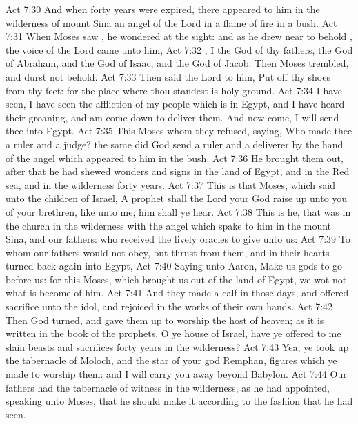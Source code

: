 \vs Act 7:30 And when forty years were expired, there appeared to him in the wilderness of mount Sina an angel of the Lord in a flame of fire in a bush.
\vs Act 7:31 When Moses saw , he wondered at the sight: and as he drew near to behold , the voice of the Lord came unto him,
\vs Act 7:32 , I  the God of thy fathers, the God of Abraham, and the God of Isaac, and the God of Jacob. Then Moses trembled, and durst not behold.
\vs Act 7:33 Then said the Lord to him, Put off thy shoes from thy feet: for the place where thou standest is holy ground.
\vs Act 7:34 I have seen, I have seen the affliction of my people which is in Egypt, and I have heard their groaning, and am come down to deliver them. And now come, I will send thee into Egypt.
\vs Act 7:35 This Moses whom they refused, saying, Who made thee a ruler and a judge? the same did God send  a ruler and a deliverer by the hand of the angel which appeared to him in the bush.
\vs Act 7:36 He brought them out, after that he had shewed wonders and signs in the land of Egypt, and in the Red sea, and in the wilderness forty years.
\vs Act 7:37 This is that Moses, which said unto the children of Israel, A prophet shall the Lord your God raise up unto you of your brethren, like unto me; him shall ye hear.
\vs Act 7:38 This is he, that was in the church in the wilderness with the angel which spake to him in the mount Sina, and  our fathers: who received the lively oracles to give unto us:
\vs Act 7:39 To whom our fathers would not obey, but thrust  from them, and in their hearts turned back again into Egypt,
\vs Act 7:40 Saying unto Aaron, Make us gods to go before us: for  this Moses, which brought us out of the land of Egypt, we wot not what is become of him.
\vs Act 7:41 And they made a calf in those days, and offered sacrifice unto the idol, and rejoiced in the works of their own hands.
\vs Act 7:42 Then God turned, and gave them up to worship the host of heaven; as it is written in the book of the prophets, O ye house of Israel, have ye offered to me slain beasts and sacrifices  forty years in the wilderness?
\vs Act 7:43 Yea, ye took up the tabernacle of Moloch, and the star of your god Remphan, figures which ye made to worship them: and I will carry you away beyond Babylon.
\vs Act 7:44 Our fathers had the tabernacle of witness in the wilderness, as he had appointed, speaking unto Moses, that he should make it according to the fashion that he had seen.
